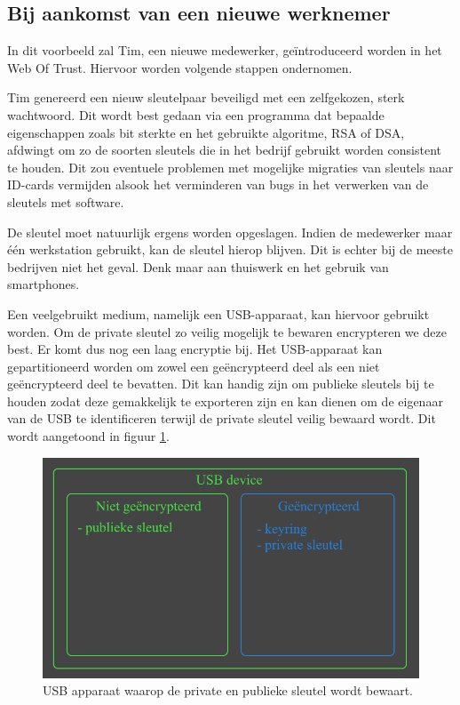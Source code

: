 \subsection{Bij aankomst van een nieuwe werknemer}
\label{subsec:aankomst-nieuwe-werknemer}
In dit voorbeeld zal Tim, een nieuwe medewerker, geïntroduceerd worden in het
Web Of Trust. Hiervoor worden volgende stappen ondernomen.

Tim genereerd een nieuw sleutelpaar beveiligd met een zelfgekozen, sterk
wachtwoord. Dit wordt best gedaan via een programma dat bepaalde eigenschappen
zoals bit sterkte en het gebruikte algoritme, RSA of DSA, afdwingt om zo de
soorten sleutels die in het bedrijf gebruikt worden consistent te houden. Dit
zou eventuele problemen met mogelijke migraties van sleutels naar ID-cards
vermijden alsook het verminderen van bugs in het verwerken van de sleutels met
software.

De sleutel moet natuurlijk ergens worden opgeslagen. Indien de medewerker maar
één werkstation gebruikt, kan de sleutel hierop blijven. Dit is echter bij de
meeste bedrijven niet het geval. Denk maar aan thuiswerk en het gebruik van
smartphones.

Een veelgebruikt medium, namelijk een USB-apparaat, kan hiervoor gebruikt
worden. Om de private sleutel zo veilig mogelijk te bewaren encrypteren we deze
best. Er komt dus nog een laag encryptie bij. Het USB-apparaat kan
gepartitioneerd worden om zowel een geëncrypteerd deel als een niet
geëncrypteerd deel te bevatten. Dit kan handig zijn om publieke sleutels bij te
houden zodat deze gemakkelijk te exporteren zijn en kan dienen om de eigenaar
van de USB te identificeren terwijl de private sleutel veilig bewaard wordt. Dit
wordt aangetoond in figuur \ref{fig:usb-device}.

\begin{figure}[H]
	\includegraphics[width=\textwidth,keepaspectratio]{img/usb-store-with-gpg-keys.png}
	\centering
	\caption{USB apparaat waarop de private en publieke sleutel wordt bewaart.}
	\label{fig:usb-device}
\end{figure}

